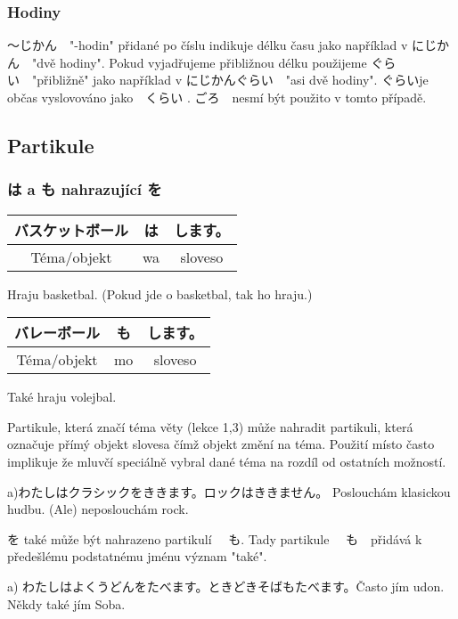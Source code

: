 \subsubsection{Hodiny}

〜じかん　"-hodin" přidané po číslu indikuje délku času jako například v にじかん　"dvě hodiny". Pokud vyjadřujeme přibližnou délku použijeme ぐらい　"přibližně" jako například v にじかんぐらい　"asi dvě hodiny". ぐらいje občas vyslovováno jako　くらい . ごろ　nesmí být použito v tomto případě.


\subsection{Partikule}
\subsubsection{は a も nahrazující を}
\begin{center}
\begin{tabular}{||c|c||c||}
\hline
バスケットボール&は&します。\\
\hline
Téma/objekt&wa&sloveso\\
\hline
\end{tabular} 
\end{center}
Hraju basketbal. (Pokud jde o basketbal, tak ho hraju.)

\begin{center}
\begin{tabular}{||c|c||c||}
\hline
バレーボール&も&します。\\
\hline
Téma/objekt&mo&sloveso\\
\hline
\end{tabular}
\end{center}
Také hraju volejbal.

Partikule, která značí téma věty (lekce 1,3) může nahradit partikuli, která označuje přímý objekt slovesa čímž objekt změní na téma. Použití  místo často implikuje že mluvčí speciálně vybral dané téma na rozdíl od ostatních možností. 


a)わたしはクラシックをききます。ロックはききません。 Poslouchám klasickou hudbu. (Ale) neposlouchám rock.

を také může být nahrazeno partikulí 　も. Tady partikule 　も　přidává k předešlému podstatnému jménu význam "také".

a) わたしはよくうどんをたべます。ときどきそばもたべます。Často jím udon. Někdy také jím Soba.



